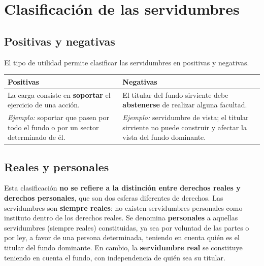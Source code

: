\documentclass[12pt,oneside]{book}
\begin{document}
\section{Clasificación de las servidumbres}

\subsection{Positivas y negativas}

El tipo de utilidad permite clasificar las servidumbres en positivas y negativas.

\begin{table}[H]
\centering
\begin{tabularx}{\textwidth}{@{}>{\raggedright\arraybackslash}X>{\raggedright\arraybackslash}X@{}}
\toprule
\textbf{Positivas} & \textbf{Negativas} \\
\midrule
La carga consiste en \textbf{soportar} el ejercicio de una acción. & El titular del fundo sirviente debe \textbf{abstenerse} de realizar alguna facultad. \\
\textit{Ejemplo:} soportar que pasen por todo el fundo o por un sector determinado de él. & \textit{Ejemplo:} servidumbre de vista; el titular sirviente no puede construir y afectar la vista del fundo dominante. \\
\bottomrule
\end{tabularx}
\end{table}

\subsection{Reales y personales}

Esta clasificación \textbf{no se refiere a la distinción entre derechos reales y derechos personales}, que son dos esferas diferentes de derechos. Las servidumbres son \textbf{siempre reales}: no existen servidumbres personales como instituto dentro de los derechos reales. Se denomina \textbf{personales} a aquellas servidumbres (siempre reales) constituidas, ya sea por voluntad de las partes o por ley, a favor de una persona determinada, teniendo en cuenta quién es el titular del fundo dominante. En cambio, la \textbf{servidumbre real} se constituye teniendo en cuenta el fundo, con independencia de quién sea su titular.

\end{document}
